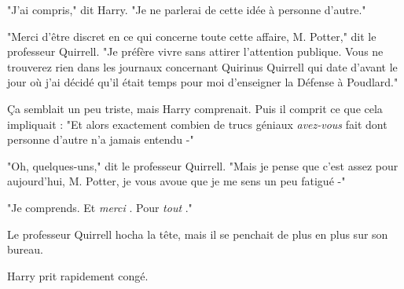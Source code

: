 "J'ai compris," dit Harry. "Je ne parlerai de cette idée à personne d'autre."

"Merci d'être discret en ce qui concerne toute cette affaire, M. Potter," dit le professeur Quirrell. "Je préfère vivre sans attirer l'attention publique. Vous ne trouverez rien dans les journaux concernant Quirinus Quirrell qui date d'avant le jour où j'ai décidé qu'il était temps pour moi d'enseigner la Défense à Poudlard."

Ça semblait un peu triste, mais Harry comprenait. Puis il comprit ce que cela impliquait : "Et alors exactement combien de trucs géniaux \emph{avez-vous}  fait dont personne d'autre n'a jamais entendu -"

"Oh, quelques-uns," dit le professeur Quirrell. "Mais je pense que c'est assez pour aujourd'hui, M. Potter, je vous avoue que je me sens un peu fatigué -"

"Je comprends. Et \emph{merci} . Pour \emph{tout} ."

Le professeur Quirrell hocha la tête, mais il se penchait de plus en plus sur son bureau.

Harry prit rapidement congé.


